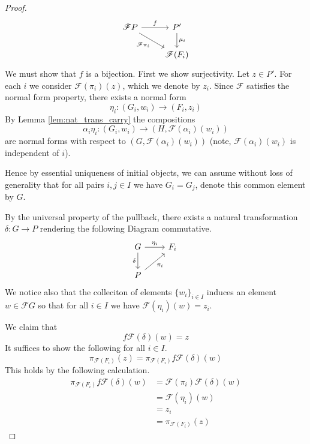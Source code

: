 \documentclass[12pt]{article}
\theoremstyle{plain}
\theoremstyle{definition}
\newcommand{\scr}[1]{\mathscr{#1}}
\newcommand{\lto}{\longrightarrow}
\begin{document}
\begin{proof}
		\begin{equation}
			\begin{tikzcd}\label{eq:induced_commutativity}
				\scr{F}P\arrow[r,"{f}"]\arrow[dr,swap,"{\scr{F}\pi_i}"] & P'\arrow[d,"{\mu_i}"]\\
				& \scr{F}(F_i)
				\end{tikzcd}
			\end{equation}
		We must show that $f$ is a bijection. First we show surjectivity. Let $z \in P'$. For each $i$ we consider $\scr{F}(\pi_i)(z)$, which we denote by $z_i$. Since $\scr{F}$ satisfies the normal form property, there exists a normal form
		\begin{equation}
			\eta_i: (G_i, w_i) \lto (F_i, z_i)
			\end{equation}
		By Lemma \ref{lem:nat_trans_carry} the compositions
		\begin{equation}
			\alpha_i \eta_i: (G_i, w_i) \lto (H, \scr{F}(\alpha_i)(w_i))
			\end{equation}
		are normal forms with respect to $(G, \scr{F}(\alpha_i)(w_i))$ (note, $\scr{F}(\alpha_i)(w_i)$ is independent of $i$).
		
		Hence by essential uniqueness of initial objects, we can assume without loss of generality that for all pairs $i,j \in I$ we have $G_i = G_j$, denote this common element by $G$.
		
		By the universal property of the pullback, there exists a natural transformation $\delta: G \lto P$ rendering the following Diagram commutative.
		\begin{equation}
			\begin{tikzcd}
				G\arrow[d,swap,"{\delta}"]\arrow[r,"{\eta_i}"] & F_i\\
				P\arrow[ur,swap,"{\pi_i}"]
				\end{tikzcd}
			\end{equation}
		We notice also that the colleciton of elements $\lbrace w_i \rbrace_{i \in I}$ induces an element $w \in \scr{F}G$ so that for all $i \in I$ we have $\scr{F}(\eta_i)(w) = z_i$.
	
		We claim that
		\begin{equation}
			f\scr{F}(\delta)(w) = z
			\end{equation}
		It suffices to show the following for all $i \in I$.
		\begin{equation}
			\pi_{\scr{F}(F_i)}(z) = \pi_{\scr{F}(F_i)}f\scr{F}(\delta)(w)
			\end{equation}
		This holds by the following calculation.
		\begin{align}
			\pi_{\scr{F}(F_i)}f\scr{F}(\delta)(w) &= \scr{F}(\pi_i) \scr{F}(\delta)(w)\\
			&= \scr{F}(\eta_i)(w)\\
			&= z_i\\
			&= \pi_{\scr{F}(F_i)}(z)
			\end{align}
		

\end{proof}
\end{document}

